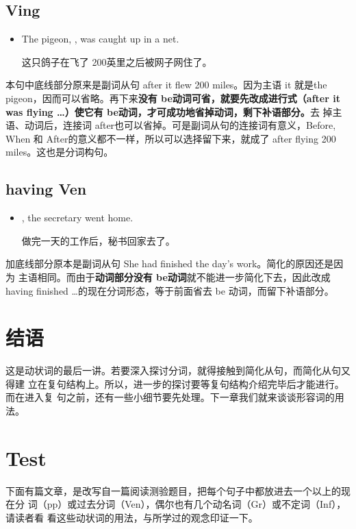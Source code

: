 \subsection{Ving}

\begin{itemize}
\item The pigeon, , was caught up in a net.

  这只鸽子在飞了 200英里之后被网子网住了。
\end{itemize}

本句中底线部分原来是副词从句 after it flew 200 miles。因为主语 it 就是the
pigeon，因而可以省略。再下来\textbf{没有 be动词可省，就要先改成进行式（after
  it was flying \ldots）使它有 be动词，才可成功地省掉动词，剩下补语部分。}去
掉主语、动词后，连接词 after也可以省掉。可是副词从句的连接词有意义，Before,
When 和 After的意义都不一样，所以可以选择留下来，就成了 after flying 200
miles。这也是分词构句。

\subsection{having Ven}

\begin{itemize}
\item {}, the secretary went home.

  做完一天的工作后，秘书回家去了。
\end{itemize}

加底线部分原本是副词从句 She had finished the day's work。简化的原因还是因为
主语相同。而由于\textbf{动词部分没有 be动词}就不能进一步简化下去，因此改成 having
finished \ldots{}的现在分词形态，等于前面省去 be 动词，而留下补语部分。

\section{结语}

这是动状词的最后一讲。若要深入探讨分词，就得接触到简化从句，而简化从句又得建
立在复句结构上。所以，进一步的探讨要等复句结构介绍完毕后才能进行。而在进入复
句之前，还有一些小细节要先处理。下一章我们就来谈谈形容词的用法。

\section{Test}

下面有篇文章，是改写自一篇阅读测验题目，把每个句子中都放进去一个以上的现在分
词（pp）或过去分词（Ven），偶尔也有几个动名词（Gr）或不定词（Inf），请读者看
看这些动状词的用法，与所学过的观念印证一下。

